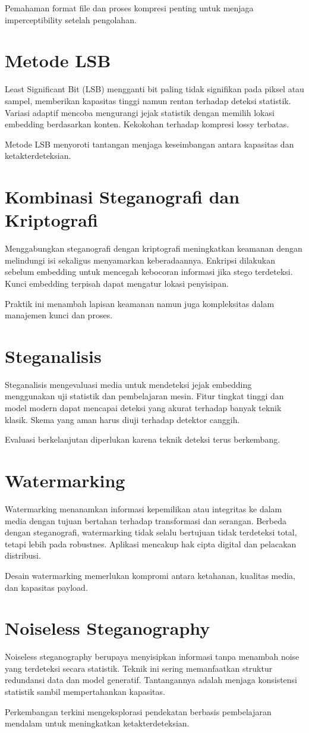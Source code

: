 \documentclass[../main.tex]{subfiles}
\begin{document}
Pemahaman format file dan proses kompresi penting untuk menjaga imperceptibility setelah pengolahan.

\section{Metode LSB}
Least Significant Bit (LSB) mengganti bit paling tidak signifikan pada piksel atau sampel, memberikan kapasitas tinggi namun rentan terhadap deteksi statistik. Variasi adaptif mencoba mengurangi jejak statistik dengan memilih lokasi embedding berdasarkan konten. Kekokohan terhadap kompresi lossy terbatas.

Metode LSB menyoroti tantangan menjaga keseimbangan antara kapasitas dan ketakterdeteksian.

\section{Kombinasi Steganografi dan Kriptografi}
Menggabungkan steganografi dengan kriptografi meningkatkan keamanan dengan melindungi isi sekaligus menyamarkan keberadaannya. Enkripsi dilakukan sebelum embedding untuk mencegah kebocoran informasi jika stego terdeteksi. Kunci embedding terpisah dapat mengatur lokasi penyisipan.

Praktik ini menambah lapisan keamanan namun juga kompleksitas dalam manajemen kunci dan proses.

\section{Steganalisis}
Steganalisis mengevaluasi media untuk mendeteksi jejak embedding menggunakan uji statistik dan pembelajaran mesin. Fitur tingkat tinggi dan model modern dapat mencapai deteksi yang akurat terhadap banyak teknik klasik. Skema yang aman harus diuji terhadap detektor canggih.

Evaluasi berkelanjutan diperlukan karena teknik deteksi terus berkembang.

\section{Watermarking}
Watermarking menanamkan informasi kepemilikan atau integritas ke dalam media dengan tujuan bertahan terhadap transformasi dan serangan. Berbeda dengan steganografi, watermarking tidak selalu bertujuan tidak terdeteksi total, tetapi lebih pada robustnes. Aplikasi mencakup hak cipta digital dan pelacakan distribusi.

Desain watermarking memerlukan kompromi antara ketahanan, kualitas media, dan kapasitas payload.

\section{Noiseless Steganography}
Noiseless steganography berupaya menyisipkan informasi tanpa menambah noise yang terdeteksi secara statistik. Teknik ini sering memanfaatkan struktur redundansi data dan model generatif. Tantangannya adalah menjaga konsistensi statistik sambil mempertahankan kapasitas.

Perkembangan terkini mengeksplorasi pendekatan berbasis pembelajaran mendalam untuk meningkatkan ketakterdeteksian.
\end{document}
